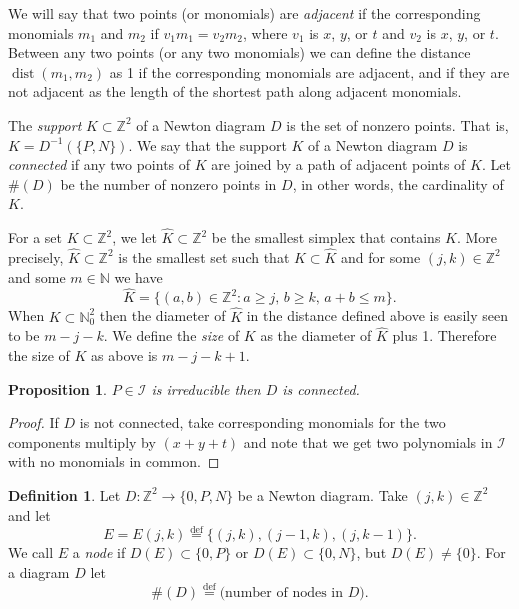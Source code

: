 \documentclass[12pt,openany]{book}
\newcommand{\Z}{{\mathbb{Z}}}
\newcommand{\N}{{\mathbb{N}}}
\newcommand{\sI}{{\mathcal{I}}}
\theoremstyle{plain}
\newtheorem{prop}[thm]{Proposition}
\theoremstyle{remark}
\theoremstyle{definition}
\newtheorem{defn}[thm]{Definition}
\theoremstyle{exercise}
\theoremstyle{example}
\begin{document}
We will say that two points (or monomials) are \emph{adjacent}
if the corresponding monomials $m_1$ and $m_2$ if
$v_1 m_1 = v_2 m_2$, where $v_1$ is $x$, $y$, or $t$
and $v_2$ is $x$, $y$, or $t$.
Between any two points (or any two monomials)
we can define the distance
$\operatorname{dist}(m_1,m_2)$ as 1 if the corresponding
monomials are adjacent, and if they are not adjacent as the length
of the
shortest path along adjacent monomials.

The {\emph{support}} $K \subset \Z^2$ of a Newton diagram $D$ is the set
of nonzero points.  That is, $K = D^{-1}(\{ P, N \})$.
We say that the support $K$ of a Newton diagram $D$ is \emph{connected} if
any two points of $K$ are joined by a path of
adjacent points of $K$.
Let $\#(D)$ be the number of nonzero points in $D$, in other words, the
cardinality of $K$.

For a set $K \subset \Z^2$, we let $\widehat{K} \subset \Z^2$ be the smallest
simplex that contains $K$.
More precisely, $\widehat{K} \subset \Z^2$ is the
smallest
set such that $K \subset \widehat{K}$ and for some
$(j,k) \in \Z^2$
and some $m \in \N$ we have
\begin{equation}
\widehat{K} = \{(a,b) \in \Z^2 : a \geq j, \, b \geq k, \, a+b \leq m \}.
\end{equation}
When $K \subset \N_0^2$ then the diameter of $\widehat{K}$ in the distance defined above
is easily seen to be $m-j-k$.  We define the \emph{size} of $K$ as the diameter of
$\widehat{K}$ plus 1.  Therefore the size of $K$ as above is $m-j-k+1$.

\begin{prop}
$P \in \sI$ is irreducible then $D$ is connected.
\end{prop}

\begin{proof}
If $D$ is not connected, take corresponding monomials
for the two components multiply by $(x+y+t)$ and note that we
get two polynomials in $\sI$
with no monomials in common.
\end{proof}

\begin{defn}
Let $D \colon \Z^2 \to \{ 0, P, N \}$ be a Newton diagram.
Take $(j,k) \in \Z^2$
and let
\begin{equation}
E = E(j,k) \overset{\text{def}}{=} \{ (j,k) , (j-1,k) , (j,k-1) \} .
\end{equation}
We call $E$
a \emph{node} if
$D(E) \subset \{ 0, P \}$ or $D(E) \subset \{ 0, N \}$,
but $D(E) \not= \{ 0 \}$.
For a diagram $D$ let
\begin{equation}
\#(D) \overset{\text{def}}{=} \text{(number of nodes in $D$)} .
\end{equation}
\end{defn}
\end{document}
